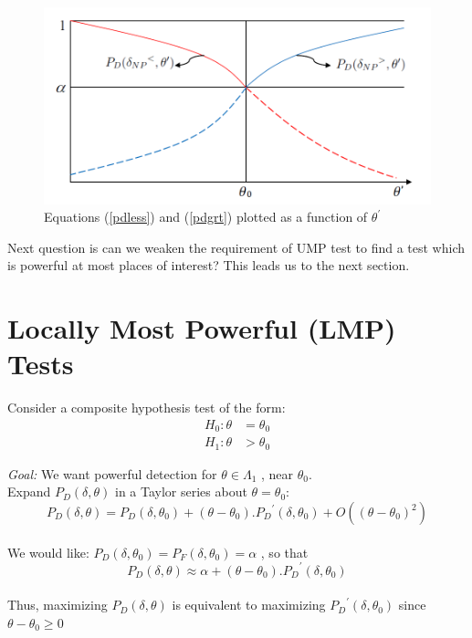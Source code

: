 \documentclass[12pt]{report}
\begin{document}
\begin{exmp}
\begin{figure}[h]
\centering
\includegraphics[scale=0.5]{Figures/Lecture8_Fig2}
\caption{Equations (\ref{pdless}) and (\ref{pdgrt}) plotted as a function of $\theta^\prime$ }
\label{UMPtestFail}
\end{figure}

\end{exmp}
\noindent Next question is can we weaken the requirement of UMP test to find a test which is powerful at most places of interest? This leads us to the next section.

\section{Locally Most Powerful (LMP) Tests}

Consider a composite hypothesis test of the form:
\begin{align*}
H_0:\theta &= \theta_0 \\
H_1:\theta &> \theta_0
\end{align*}

\noindent \emph{Goal:} We want powerful detection for $\theta\in\Lambda_1$ , near $\theta_0$.\\
Expand $P_D(\delta,\theta)$ in a Taylor series about $\theta=\theta_0$:\\
$$P_D(\delta,\theta)=P_D(\delta,\theta_0) + (\theta-\theta_0).{P_D}^\prime(\delta,\theta_0) + O((\theta-\theta_0)^2)$$\\
We would like: $P_D(\delta,\theta_0)=P_F(\delta,\theta_0)=\alpha$ , so that\\
$$P_D(\delta,\theta)\approx \alpha + (\theta-\theta_0).{P_D}^\prime(\delta,\theta_0)$$\\
Thus, maximizing $P_D(\delta,\theta)$ is equivalent to maximizing ${P_D}^\prime(\delta,\theta_0)$ since $\theta-\theta_0 \geq 0$\\
\end{document}
